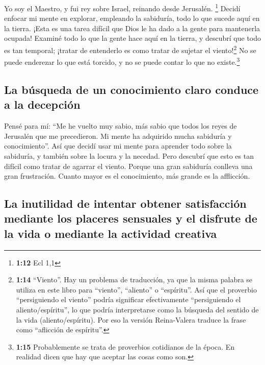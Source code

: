  Yo soy el Maestro, y fui rey sobre Israel, reinando
desde Jerusalén. \footnote{\textbf{1:12} Ecl 1,1}  Decidí
enfocar mi mente en explorar, empleando la sabiduría, todo lo que sucede
aquí en la tierra. ¡Esta es una tarea difícil que Dios le ha dado a la
gente para mantenerla ocupada!  Examiné todo lo que la
gente hace aquí en la tierra, y descubrí que todo es tan temporal;
¡tratar de entenderlo es como tratar de sujetar el viento!\footnote{\textbf{1:14}
  ``Viento''. Hay un problema de traducción, ya que la misma palabra se
  utiliza en este libro para ``viento'', ``aliento'' o ``espíritu''. Así
  que el proverbio ``persiguiendo el viento'' podría significar
  efectivamente ``persiguiendo el aliento/espíritu'', lo que podría
  interpretarse como la búsqueda del sentido de la vida
  (aliento/espíritu). Por eso la versión Reina-Valera traduce la frase
  como ``aflicción de espíritu''.}  No se puede enderezar
lo que está torcido, y no se puede contar lo que no existe.\footnote{\textbf{1:15}
  Probablemente se trata de proverbios cotidianos de la época. En
  realidad dicen que hay que aceptar las cosas como son.}

\hypertarget{la-buxfasqueda-de-un-conocimiento-claro-conduce-a-la-decepciuxf3n}{%
\subsection{La búsqueda de un conocimiento claro conduce a la
decepción}\label{la-buxfasqueda-de-un-conocimiento-claro-conduce-a-la-decepciuxf3n}}

 Pensé para mí: ``Me he vuelto muy sabio, más sabio que
todos los reyes de Jerusalén que me precedieron. Mi mente ha adquirido
mucha sabiduría y conocimiento''.  Así que decidí usar mi
mente para aprender todo sobre la sabiduría, y también sobre la locura y
la necedad. Pero descubrí que esto es tan difícil como tratar de agarrar
el viento.  Porque una gran sabiduría conlleva una gran
frustración. Cuanto mayor es el conocimiento, más grande es la
afflicción.

\hypertarget{la-inutilidad-de-intentar-obtener-satisfacciuxf3n-mediante-los-placeres-sensuales-y-el-disfrute-de-la-vida-o-mediante-la-actividad-creativa}{%
\subsection{La inutilidad de intentar obtener satisfacción mediante los
placeres sensuales y el disfrute de la vida o mediante la actividad
creativa}\label{la-inutilidad-de-intentar-obtener-satisfacciuxf3n-mediante-los-placeres-sensuales-y-el-disfrute-de-la-vida-o-mediante-la-actividad-creativa}}

